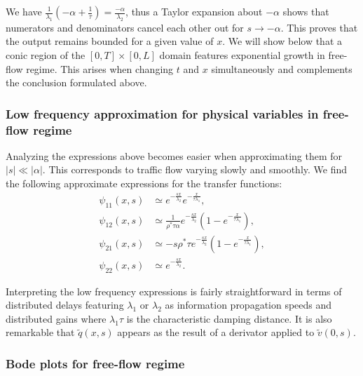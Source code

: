 \documentclass[a4paper, 10pt, conference]{ieeeconf}      %
\begin{document}
We have $\frac{1}{\lambda_{1}}\left(-\alpha+\frac{1}{\tau}\right) = \frac{-\alpha}{\lambda_{2}}$, thus a Taylor expansion about $-\alpha$ shows that numerators and denominators cancel each other out for $s \rightarrow -\alpha$. This proves that the output remains bounded for a given value of $x$. We will show below that a conic region of the $\left[0,T\right] \times \left[0,L\right]$ domain features exponential growth in free-flow regime. This arises when changing $t$ and $x$ simultaneously and complements the conclusion formulated above.\\

\subsubsection{Low frequency approximation for physical variables in free-flow regime}
Analyzing the expressions above becomes easier when approximating them for $\left|s\right|\ll\left|\alpha\right|$. This corresponds to traffic flow varying slowly and smoothly. We find the following approximate expressions for the transfer functions:
{\footnotesize
\begin{subequations}
\begin{align}
\psi_{11}(x,s)
&\simeq
e^{-\frac{sx}{\lambda_{2}}}
e^{-\frac{x}{\tau\lambda_{1}}}
, \\
\psi_{12}(x,s)
&\simeq
\frac{
	1
}{
	\rho^{*}\tau\alpha
}
e^{-\frac{sx}{\lambda_{2}}}
\left(
	1 - e^{-\frac{x}{\tau\lambda_{1}}}
\right)
, \\
\psi_{21}(x,s)
& \simeq
- s \rho^{*} \tau
e^{-\frac{sx}{\lambda_{2}}}
\left(
	1 - e^{-\frac{x}{\tau\lambda_{1}}}
\right)
, \\
\psi_{22}(x,s)
&\simeq
e^{-\frac{sx}{\lambda_{2}}}
.
\end{align}
\end{subequations}
}

Interpreting the low frequency expressions is fairly straightforward in terms of distributed delays featuring $\lambda_1$ or $\lambda_2$ as information propagation speeds and distributed gains where $\lambda_1 \tau$ is the characteristic damping distance. It is also remarkable that $\widetilde{q}(x,s)$ appears as the result of a derivator applied to $\widetilde{v}(0,s)$.\\

\subsubsection{Bode plots for free-flow regime}
\end{document}
